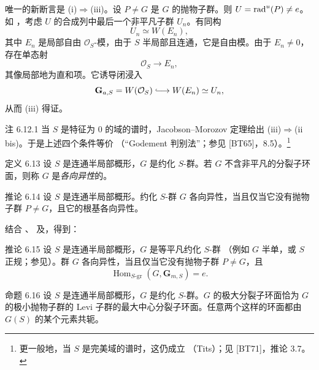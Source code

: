 唯一的新断言是 \textup{(i)}\(\Rightarrow\)\textup{(iii)}。设 \(P\ne G\) 是 \(G\) 的抛物子群。则 \(U=\operatorname{rad}^u(P)\ne e\)。如 ，考虑 \(U\) 的合成列中最后一个非平凡子群 \(U_n\)。有同构
\[
 U_n\simeq W(E_n),
\]
其中 \(E_n\) 是局部自由 \(\mathcal O_S\)-模，由于 \(S\) 半局部且连通，它是自由模。由于 \(E_n\ne0\)，存在单态射
\[
 \mathcal O_S\longrightarrow E_n,
\]
其像局部地为直和项。它诱导闭浸入
\[
 \mathbf G_{a,S}=W(\mathcal O_S)
   \lhook\joinrel\longrightarrow W(E_n)\simeq U_n,
\]
从而 \textup{(iii)} 得证。

\begin{sgastatement}{注 6.12.1}
当 \(S\) 是特征为 \(0\) 的域的谱时，Jacobson--Morozov 定理给出 \textup{(iii)}\(\Rightarrow\)\textup{(ii bis)}。于是上述四个条件等价 \textup{（“Godement 判别法”；参见 \textup{[BT65]}，8.5）}。\footnote{更一般地，当 \(S\) 是完美域的谱时，这仍成立 \textup{（Tits）}；见 \textup{[BT71]}，推论 3.7。}
\end{sgastatement}

\begin{sgastatement}{定义 6.13}
设 \(S\) 是连通半局部概形，\(G\) 是约化 \(S\)-群。若 \(G\) 不含非平凡的分裂子环面，则称 \(G\) 是\emph{各向异性}的。
\end{sgastatement}

\begin{sgastatement}{推论 6.14}
设 \(S\) 是连通半局部概形。约化 \(S\)-群 \(G\) 各向异性，当且仅当它没有抛物子群 \(P\ne G\)，且它的根基各向异性。
\end{sgastatement}

结合 、 及，得到：

\begin{sgastatement}{推论 6.15}
设 \(S\) 是连通半局部概形，\(G\) 是等平凡约化 \(S\)-群 \textup{（例如 \(G\) 半单，或 \(S\) 正规；参见）}。群 \(G\) 各向异性，当且仅当它没有抛物子群 \(P\ne G\)，且
\[
 \operatorname{Hom}_{S\text{-}\mathrm{gr}}
   (G,\mathbf G_{m,S})=e.
\]
\end{sgastatement}

\begin{sgastatement}{命题 6.16}
设 \(S\) 是连通半局部概形，\(G\) 是约化 \(S\)-群。\(G\) 的极大分裂子环面恰为 \(G\) 的极小抛物子群的 Levi 子群的最大中心分裂子环面。任意两个这样的环面都由 \(G(S)\) 的某个元素共轭。
\end{sgastatement}

